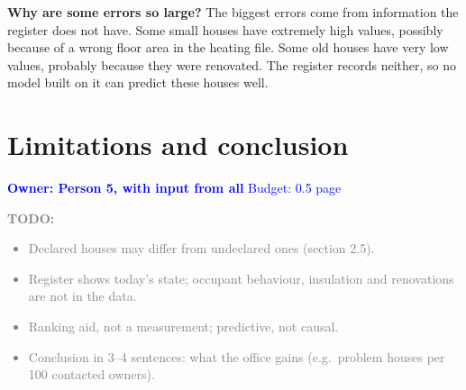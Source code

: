 \documentclass[11pt,a4paper]{article}
\newcommand{\owner}[2]{\noindent\textcolor{blue}{\textbf{Owner: #1} \quad Budget: #2}\par\medskip}
\newcommand{\todo}[1]{\noindent\textcolor{gray}{\small\textbf{TODO:} #1}\par\medskip}
\begin{document}
\textbf{Why are some errors so large?} The biggest errors come from information the register does not have. Some small houses have extremely high values, possibly because of a wrong floor area in the heating file. Some old houses have very low values, probably because they were renovated. The register records neither, so no model built on it can predict these houses well.

\section{Limitations and conclusion}
\owner{Person 5, with input from all}{0.5 page}
\todo{
\begin{itemize}
  \item Declared houses may differ from undeclared ones (section 2.5).
  \item Register shows today's state; occupant behaviour, insulation and renovations are not in the data.
  \item Ranking aid, not a measurement; predictive, not causal.
  \item Conclusion in 3--4 sentences: what the office gains (e.g.\ problem houses per 100 contacted owners).
\end{itemize}}
\end{document}
